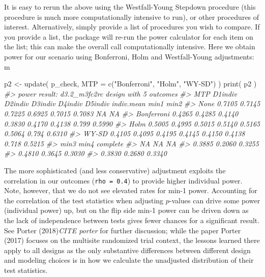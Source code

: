 \documentclass[
]{article}
\newenvironment{Shaded}{\begin{snugshade}}{\end{snugshade}}
\newcommand{\AttributeTok}[1]{\textcolor[rgb]{0.77,0.63,0.00}{#1}}
\newcommand{\CommentTok}[1]{\textcolor[rgb]{0.56,0.35,0.01}{\textit{#1}}}
\newcommand{\FunctionTok}[1]{\textcolor[rgb]{0.00,0.00,0.00}{#1}}
\newcommand{\NormalTok}[1]{#1}
\newcommand{\OtherTok}[1]{\textcolor[rgb]{0.56,0.35,0.01}{#1}}
\newcommand{\StringTok}[1]{\textcolor[rgb]{0.31,0.60,0.02}{#1}}
\begin{document}
It is easy to rerun the above using the Westfall-Young Stepdown
procedure (this procedure is much more computationally intensive to
run), or other procedures of interest. Alternatively, simply provide a
list of procedures you wish to compare. If you provide a list, the
package will re-run the power calculator for each item on the list; this
can make the overall call computationally intensive. Here we obtain
power for our scenario using Bonferroni, Holm and Westfall-Young
adjustments: m

\begin{Shaded}
\begin{Highlighting}[]
\NormalTok{p2 }\OtherTok{\textless{}{-}} \FunctionTok{update}\NormalTok{( p\_check, }\AttributeTok{MTP =} \FunctionTok{c}\NormalTok{(}\StringTok{"Bonferroni"}\NormalTok{, }\StringTok{"Holm"}\NormalTok{, }\StringTok{"WY{-}SD"}\NormalTok{) )}
\FunctionTok{print}\NormalTok{( p2 )}
\CommentTok{\#\textgreater{} power result: d3.2\_m3fc2rc design with 5 outcomes}
\CommentTok{\#\textgreater{}         MTP D1indiv D2indiv D3indiv D4indiv D5indiv indiv.mean  min1   min2}
\CommentTok{\#\textgreater{}        None  0.7105  0.7145  0.7225  0.6925  0.7015     0.7083    NA     NA}
\CommentTok{\#\textgreater{}  Bonferroni  0.4265  0.4285  0.4140  0.3830  0.4170     0.4138 0.799 0.5990}
\CommentTok{\#\textgreater{}        Holm  0.5005  0.4995  0.5015  0.5140  0.5165     0.5064 0.794 0.6310}
\CommentTok{\#\textgreater{}       WY{-}SD  0.4105  0.4095  0.4195  0.4145  0.4150     0.4138 0.718 0.5215}
\CommentTok{\#\textgreater{}    min3   min4 complete}
\CommentTok{\#\textgreater{}      NA     NA       NA}
\CommentTok{\#\textgreater{}  0.3885 0.2060   0.3255}
\CommentTok{\#\textgreater{}  0.4810 0.3645   0.3030}
\CommentTok{\#\textgreater{}  0.3830 0.2680   0.3340}
\end{Highlighting}
\end{Shaded}

The more sophisticated (and less conservative) adjustment exploits the
correlation in our outcomes (\texttt{rho\ =\ 0.4}) to provide higher
individual power. Note, however, that we do not see elevated rates for
min-1 power. Accounting for the correlation of the test statistics when
adjusting \(p\)-values can drive some power (individual power) up, but
on the flip side min-1 power can be driven down as the lack of
independence between tests gives fewer chances for a significant result.
See Porter (2018)\emph{CITE porter} for further discussion; while the
paper Porter (2017) focuses on the multisite randomized trial context,
the lessons learned there apply to all designs as the only substantive
differences between different design and modeling choices is in how we
calculate the unadjusted distribution of their test statistics.
\end{document}
